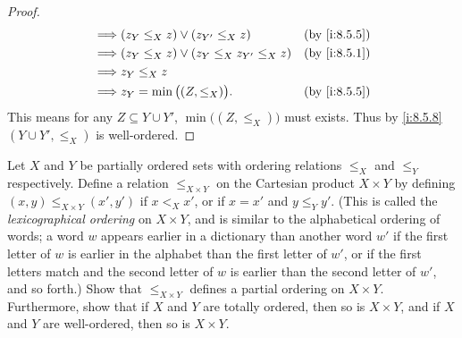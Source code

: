 \begin{proof}
\begin{align*}
    \implies & (z_Y \leq_X z) \lor (z_{Y'} \leq_X z)            &  & \by{i:8.5.5} \\
    \implies & (z_Y \leq_X z) \lor (z_Y \leq_X z_{Y'} \leq_X z) &  & \by{i:8.5.1} \\
    \implies & z_Y \leq_X z                                                       \\
    \implies & z_Y = \min\big((Z, \leq_X)\big).                 &  & \by{i:8.5.5}
  \end{align*}
  This means for any \(Z \subseteq Y \cup Y'\), \(\min\big((Z, \leq_X)\big)\) must exists.
  Thus by \cref{i:8.5.8} \((Y \cup Y', \leq_X)\) is well-ordered.
\end{proof}

\begin{ex}\label{i:ex:8.5.12}
  Let \(X\) and \(Y\) be partially ordered sets with ordering relations \(\leq_X\) and \(\leq_Y\) respectively.
  Define a relation \(\leq_{X \times Y}\) on the Cartesian product \(X \times Y\) by defining \((x, y) \leq_{X \times Y} (x', y')\) if \(x <_X x'\), or if \(x = x'\) and \(y \leq_Y y'\).
  (This is called the \emph{lexicographical ordering} on \(X \times Y\), and is similar to the alphabetical ordering of words;
  a word \(w\) appears earlier in a dictionary than another word \(w'\) if the first letter of \(w\) is earlier in the alphabet than the first letter of \(w'\), or if the first letters match and the second letter of \(w\) is earlier than the second letter of \(w'\), and so forth.)
  Show that \(\leq_{X \times Y}\) defines a partial ordering on \(X \times Y\).
  Furthermore, show that if \(X\) and \(Y\) are totally ordered, then so is \(X \times Y\), and if \(X\) and \(Y\) are well-ordered, then so is \(X \times Y\).
\end{ex}

